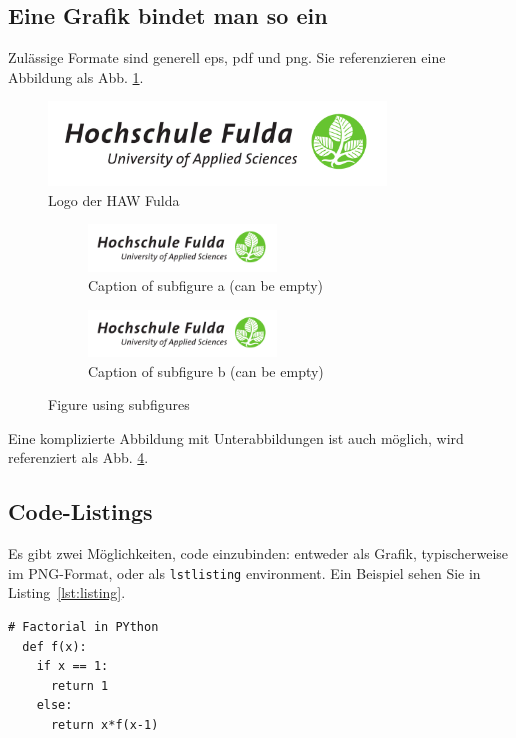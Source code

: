 \documentclass[12pt,oneside]{article}
\begin{document}
\subsection{Eine Grafik bindet man so ein}
Zulässige Formate sind generell eps, pdf und png. Sie referenzieren eine Abbildung als Abb. \ref{fig:bildchen}.
\begin{figure}[t!]
    \centering
    \includegraphics[width=0.8\textwidth]{logo.pdf}
    \caption{Logo der HAW Fulda}
    \label{fig:bildchen}
\end{figure}
\begin{figure}[b!]
	\centering
	\begin{subfigure}[b]{6cm}
	  \centering
    \includegraphics[width=5cm]{logo.pdf}
		\caption{Caption of subfigure a (can be empty)}
		\label{fig:1}
	\end{subfigure}
	\begin{subfigure}[b]{6cm}
    \centering
    \includegraphics[width=5cm]{logo.pdf}
		\caption{Caption of subfigure b (can be empty)}
		\label{fig:2}
	\end{subfigure}
\caption{Figure using subfigures}
\label{fig:figure_with_subfigures}
\end{figure}
Eine komplizierte Abbildung mit Unterabbildungen ist auch möglich, wird referenziert als Abb. \ref{fig:figure_with_subfigures}.


\subsection{Code-Listings}
Es gibt zwei Möglichkeiten, code einzubinden: entweder als Grafik, typischerweise im PNG-Format, oder als \verb|lstlisting| environment. Ein Beispiel sehen Sie in Listing~\ref{lst:listing}.
\begin{lstlisting}[label=lst:listing, caption={Ein Python-Listing. Syntax-Highlighting uvm. ist möglich, prüfen Sie die Optionen des listing-Pakets.}]
  # Factorial in PYthon
  def f(x):
    if x == 1:
      return 1
    else:
      return x*f(x-1)
\end{lstlisting}
\end{document}
